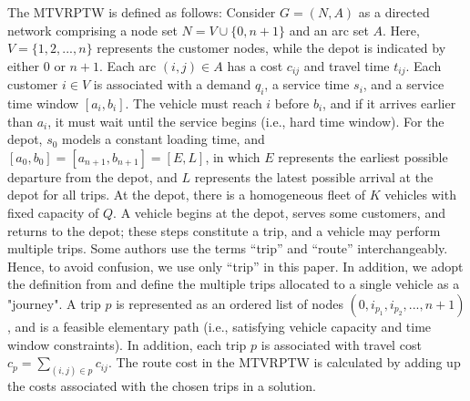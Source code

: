 \documentclass[11pt]{article}
\begin{document}
The MTVRPTW is defined as follows:  Consider $G = (N, A)$ as a directed network comprising a node set $N = V \cup \{0, n + 1\}$ and an arc set $A$.  Here, $V = \{1, 2,..., n\}$ represents the customer nodes, while the depot is indicated by either $0$ or $n + 1$.  Each arc $(i, j) \in A$ has a cost $c_{ij}$ and travel time $t_{ij}$.  Each customer $i \in V$ is associated with a demand $q_i$, a service time $s_i$, and a service time window $[a_i, b_i]$.  The vehicle must reach $i$ before $b_i$, and if it arrives earlier than $a_i$, it must wait until the service begins (i.e., hard time window).  For the depot, $s_0$ models a constant loading time, and $[a_0, b_0] = [a_{n+1}, b_{n+1}] = [E, L]$, in which $E$ represents the earliest possible departure from the depot, and $L$ represents the latest possible arrival at the depot for all trips.  At the depot, there is a homogeneous fleet of $K$ vehicles with fixed capacity of $Q$.  A vehicle begins at the depot, serves some customers, and returns to the depot; these steps constitute a trip, and a vehicle may perform multiple trips.  Some authors use the terms “trip” and “route” interchangeably. Hence, to avoid confusion, we use only “trip” in this paper.  In addition, we adopt the definition from \cite{cattaruzza2016vehicle} and define the multiple trips allocated to a single vehicle as a "journey".  A trip $p$ is represented as an ordered list of nodes $(0, i_{p_1}, i_{p_2}, ..., n + 1)$, and is a feasible elementary path (i.e., satisfying vehicle capacity and time window constraints).  In addition, each trip $p$ is associated with travel cost $c_p = \sum_{(i, j) \in p} c_{ij}$.  The route cost in the MTVRPTW is calculated by adding up the costs associated with the chosen trips in a solution.


\end{document}
